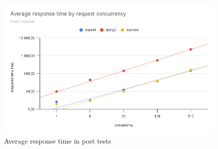 \begin{figure}[H]
    \includegraphics[width=\columnwidth]{figures/pictures/resultsPost.png}
    \caption{Average response time in post tests}
    \label{fig:resultsPost}
\end{figure}
